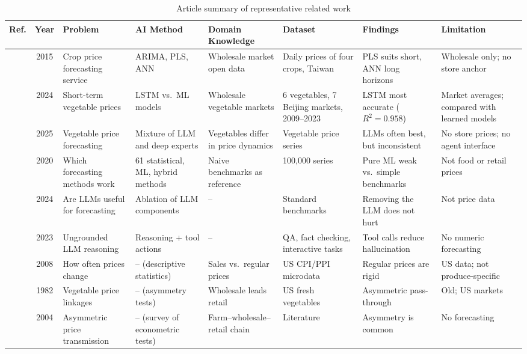 \begin{table}[t]
\caption{Article summary of representative related work}
\label{tab:summary}
\centering
\scriptsize
\setlength{\tabcolsep}{3pt}
\renewcommand{\arraystretch}{1.12}
\begin{tabularx}{\textwidth}{@{}l c Y Y Y Y Y Y@{}}
\toprule
Ref. & Year & Problem & AI Method & Domain Knowledge & Dataset & Findings & Limitation \\
\midrule
\cite{peng2015developing} & 2015 & Crop price forecasting service & ARIMA, PLS, ANN & Wholesale market open data & Daily prices of four crops, Taiwan & PLS suits short, ANN long horizons & Wholesale only; no store anchor \\
\cite{zhang2024short} & 2024 & Short-term vegetable prices & LSTM vs.\ ML models & Wholesale vegetable markets & 6 vegetables, 7 Beijing markets, 2009--2023 & LSTM most accurate ($R^2=0.958$) & Market averages; compared with learned models \\
\cite{zhao2025vegetable} & 2025 & Vegetable price forecasting & Mixture of LLM and deep experts & Vegetables differ in price dynamics & Vegetable price series & LLMs often best, but inconsistent & No store prices; no agent interface \\
\cite{makridakis2020m4} & 2020 & Which forecasting methods work & 61 statistical, ML, hybrid methods & Naive benchmarks as reference & 100,000 series & Pure ML weak vs.\ simple benchmarks & Not food or retail prices \\
\cite{tan2024language} & 2024 & Are LLMs useful for forecasting & Ablation of LLM components & -- & Standard benchmarks & Removing the LLM does not hurt & Not price data \\
\cite{yao2023react} & 2023 & Ungrounded LLM reasoning & Reasoning + tool actions & -- & QA, fact checking, interactive tasks & Tool calls reduce hallucination & No numeric forecasting \\
\cite{nakamura2008five} & 2008 & How often prices change & -- (descriptive statistics) & Sales vs.\ regular prices & US CPI/PPI microdata & Regular prices are rigid & US data; not produce-specific \\
\cite{ward1982asymmetry} & 1982 & Vegetable price linkages & -- (asymmetry tests) & Wholesale leads retail & US fresh vegetables & Asymmetric pass-through & Old; US markets \\
\cite{meyer2004asymmetric} & 2004 & Asymmetric price transmission & -- (survey of econometric tests) & Farm--wholesale--retail chain & Literature & Asymmetry is common & No forecasting \\

\end{tabularx}
\end{table}
